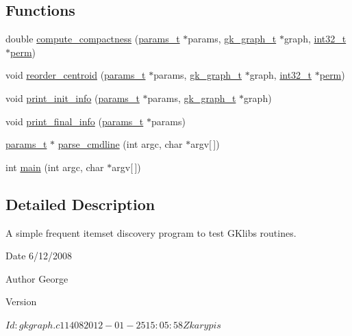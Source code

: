 \subsection*{Functions}
\begin{DoxyCompactItemize}
\item 
double \hyperlink{a00149_aaa05369855e182bb76940a4c0e3898d8}{compute\+\_\+compactness} (\hyperlink{a00706}{params\+\_\+t} $\ast$params, \hyperlink{a00638}{gk\+\_\+graph\+\_\+t} $\ast$graph, \hyperlink{a00119_a37994e3b11c72957c6f454c6ec96d43d}{int32\+\_\+t} $\ast$\hyperlink{a00879_ab96e9eb84fc7c342d17690a1341645dd}{perm})
\item 
void \hyperlink{a00149_a1a7121f82ee758732f18aedf847fe88a}{reorder\+\_\+centroid} (\hyperlink{a00706}{params\+\_\+t} $\ast$params, \hyperlink{a00638}{gk\+\_\+graph\+\_\+t} $\ast$graph, \hyperlink{a00119_a37994e3b11c72957c6f454c6ec96d43d}{int32\+\_\+t} $\ast$\hyperlink{a00879_ab96e9eb84fc7c342d17690a1341645dd}{perm})
\item 
void \hyperlink{a00149_a4598b170c85571dc5cabc5cf4c0a960f}{print\+\_\+init\+\_\+info} (\hyperlink{a00706}{params\+\_\+t} $\ast$params, \hyperlink{a00638}{gk\+\_\+graph\+\_\+t} $\ast$graph)
\item 
void \hyperlink{a00149_a702976a4c55992ddbfc1918ec1b70943}{print\+\_\+final\+\_\+info} (\hyperlink{a00706}{params\+\_\+t} $\ast$params)
\item 
\hyperlink{a00706}{params\+\_\+t} $\ast$ \hyperlink{a00149_a0e7ce196a2f8882777957bf898739f6f}{parse\+\_\+cmdline} (int argc, char $\ast$argv\mbox{[}$\,$\mbox{]})
\item 
int \hyperlink{a00149_a0ddf1224851353fc92bfbff6f499fa97}{main} (int argc, char $\ast$argv\mbox{[}$\,$\mbox{]})
\end{DoxyCompactItemize}


\subsection{Detailed Description}
A simple frequent itemset discovery program to test G\+Klib\textquotesingle{}s routines. 

\begin{DoxyDate}{Date}
6/12/2008 
\end{DoxyDate}
\begin{DoxyAuthor}{Author}
George 
\end{DoxyAuthor}
\begin{DoxyVersion}{Version}
\begin{DoxyVerb}$Id: gkgraph.c 11408 2012-01-25 15:05:58Z karypis $ \end{DoxyVerb}
 
\end{DoxyVersion}



